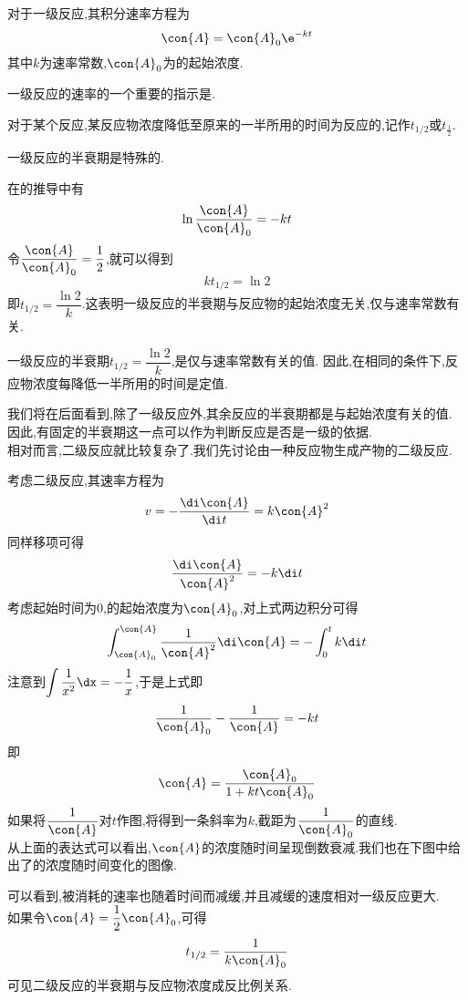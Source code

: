\documentclass{ctexart}
\begin{document}
\begin{theorem}[7B.1.2 一级反应的积分速率方程]
    对于一级反应,其积分速率方程为
    \[\con{A}=\con{A}_0\e^{-kt}\]
    其中$k$为速率常数,$\con{A}_0$为的起始浓度.
\end{theorem}
一级反应的速率的一个重要的指示是.
\begin{definition}[7B.1.3 半衰期]
    对于某个反应,某反应物浓度降低至原来的一半所用的时间为反应的,记作$t_{1/2}$或$t_{\frac12}$.
\end{definition}
一级反应的半衰期是特殊的.
\begin{derivation}
    在的推导中有
    \[\ln\dfrac{\con{A}}{\con{A}_0}=-kt\]
    令$\dfrac{\con{A}}{\con{A}_0}=\dfrac12$,就可以得到
    \[kt_{1/2}=\ln2\]
    即$t_{1/2}=\dfrac{\ln2}{k}$.这表明一级反应的半衰期与反应物的起始浓度无关,仅与速率常数有关.
\end{derivation}
\begin{theorem}[7B.1.4 一级反应的半衰期]
    一级反应的半衰期$t_{1/2}=\dfrac{\ln 2}{k}$,是仅与速率常数有关的值.%
    因此,在相同的条件下,反应物浓度每降低一半所用的时间是定值.
\end{theorem}
我们将在后面看到,除了一级反应外,其余反应的半衰期都是与起始浓度有关的值.%
因此,有固定的半衰期这一点可以作为判断反应是否是一级的依据.\vspace{4pt}\\
\indent 相对而言,二级反应就比较复杂了.我们先讨论由一种反应物生成产物的二级反应.
\begin{derivation}
    考虑二级反应,其速率方程为
    \[v=-\dfrac{\di\con{A}}{\di t}=k\con{A}^2\]
    同样移项可得
    \[\dfrac{\di\con{A}}{\con{A}^2}=-k\di t\]
    考虑起始时间为$0$,的起始浓度为$\con{A}_0$,对上式两边积分可得
    \[\int_{\con{A}_0}^{\con{A}}\dfrac{1}{\con{A}^2}\di\con{A}=-\int_0^{t}k\di t\]
    注意到$\displaystyle\int \dfrac{1}{x^2}\dx=-\dfrac{1}{x}$,于是上式即
    \[\dfrac{1}{\con{A}_0}-\dfrac{1}{\con{A}}=-kt\]
    即
    \[\con{A}=\dfrac{\con{A}_0}{1+kt\con{A}_0}\]
    如果将$\dfrac{1}{\con{A}}$对$t$作图,将得到一条斜率为$k$,截距为$\dfrac{1}{\con{A}_0}$的直线.\\
    从上面的表达式可以看出,$\con{A}$的浓度随时间呈现倒数衰减.我们也在下图中给出了的浓度随时间变化的图像.
    \begin{tightcenter}
        
    \end{tightcenter}
    可以看到,被消耗的速率也随着时间而减缓,并且减缓的速度相对一级反应更大.\\
    如果令$\con{A}=\dfrac12\con{A}_0$,可得
    \[t_{1/2}=\dfrac{1}{k\con{A}_0}\]
    可见二级反应的半衰期与反应物浓度成反比例关系.
\end{derivation}
\end{document}
